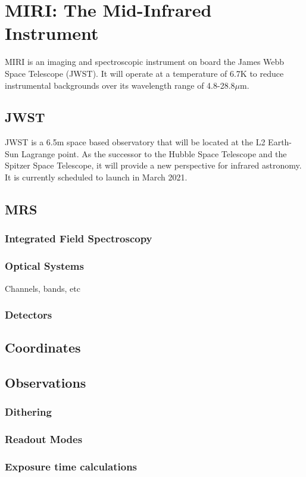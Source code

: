 \chapter{MIRI: The Mid-Infrared Instrument}
MIRI is an imaging and spectroscopic instrument on board the James Webb Space Telescope (JWST). It will operate at a temperature of 6.7K to reduce instrumental backgrounds over its wavelength range of 4.8-28.8$\mu$m.
\cite{Rieke2015} %
\cite{Kendrew2015} %
\section{JWST}
JWST is a 6.5m space based observatory that will be located at the L2 Earth-Sun Lagrange point. 
As the successor to the Hubble Space Telescope and the Spitzer Space Telescope, it will provide a new perspective for infrared astronomy. 
It is currently scheduled to launch in March 2021.
\section{MRS}\label{sec:mrs}
\cite{Wells2015} %
\subsection{Integrated Field Spectroscopy}
\subsection{Optical Systems}
Channels, bands, etc \cite{ref:Chen2019}
\subsection{Detectors}
\section{Coordinates}
\section{Observations}
\subsection{Dithering}
\subsection{Readout Modes}
\subsection{Exposure time calculations}
